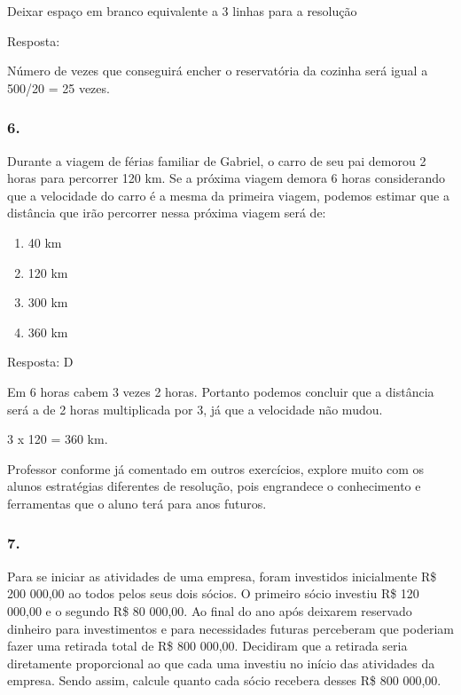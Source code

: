 Deixar espaço em branco equivalente a 3 linhas para a resolução

Resposta:

Número de vezes que conseguirá encher o reservatória da cozinha será
igual a 500/20 = 25 vezes.

\subsubsection{6.}\label{section-122}

Durante a viagem de férias familiar de Gabriel, o carro de seu pai
demorou 2 horas para percorrer 120 km. Se a próxima viagem demora 6
horas considerando que a velocidade do carro é a mesma da primeira
viagem, podemos estimar que a distância que irão percorrer nessa próxima
viagem será de:

\begin{enumerate}
\def\labelenumi{\alph{enumi})}
\item
  40 km
\item
  120 km
\item
  300 km
\item
  360 km
\end{enumerate}

Resposta: D

Em 6 horas cabem 3 vezes 2 horas. Portanto podemos concluir que a
distância será a de 2 horas multiplicada por 3, já que a velocidade não
mudou.

3 x 120 = 360 km.

Professor conforme já comentado em outros exercícios, explore muito com
os alunos estratégias diferentes de resolução, pois engrandece o
conhecimento e ferramentas que o aluno terá para anos futuros.

\subsubsection{7.}\label{section-123}

Para se iniciar as atividades de uma empresa, foram investidos
inicialmente R\$ 200 000,00 ao todos pelos seus dois sócios. O primeiro
sócio investiu R\$ 120 000,00 e o segundo R\$ 80 000,00. Ao final do ano
após deixarem reservado dinheiro para investimentos e para necessidades
futuras perceberam que poderiam fazer uma retirada total de R\$ 800
000,00. Decidiram que a retirada seria diretamente proporcional ao que
cada uma investiu no início das atividades da empresa. Sendo assim,
calcule quanto cada sócio recebera desses R\$ 800 000,00.

